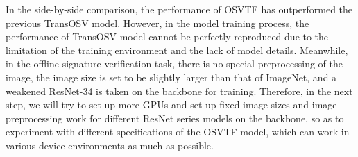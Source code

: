 In the side-by-side comparison, the performance of OSVTF has outperformed the previous TransOSV model. However, in the model training process, the performance of TransOSV model cannot be perfectly reproduced due to the limitation of the training environment and the lack of model details. Meanwhile, in the offline signature verification task, there is no special preprocessing of the image, the image size is set to be slightly larger than that of ImageNet, and a weakened ResNet-34 is taken on the backbone for training. Therefore, in the next step, we will try to set up more GPUs and set up fixed image sizes and image preprocessing work for different ResNet series models on the backbone, so as to experiment with different specifications of the OSVTF model, which can work in various device environments as much as possible.













